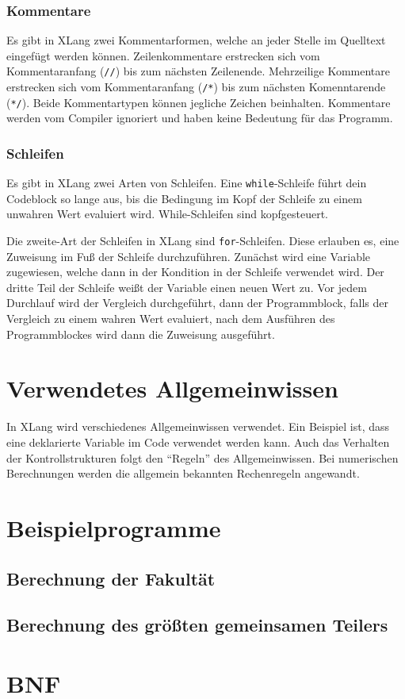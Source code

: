 \documentclass[a4paper]{article}
\begin{document}
\subsubsection{Kommentare}

Es gibt in XLang zwei Kommentarformen, welche an jeder Stelle im Quelltext eingefügt werden können.
Zeilenkommentare erstrecken sich vom Kommentaranfang (\texttt{//}) bis zum nächsten Zeilenende.
Mehrzeilige Kommentare erstrecken sich vom Kommentaranfang (\texttt{/*}) bis zum nächsten
Komenntarende (\texttt{*/}).
Beide Kommentartypen können jegliche Zeichen beinhalten.
Kommentare werden vom Compiler ignoriert und haben keine Bedeutung für das Programm.

\subsubsection{Schleifen}

Es gibt in XLang zwei Arten von Schleifen. Eine \texttt{while}-Schleife führt dein Codeblock so
lange aus, bis die Bedingung im Kopf der Schleife zu einem unwahren Wert evaluiert wird.
While-Schleifen sind kopfgesteuert.

Die zweite-Art der Schleifen in XLang sind \texttt{for}-Schleifen. Diese erlauben es, eine Zuweisung
im Fuß der Schleife durchzuführen. Zunächst wird eine Variable zugewiesen, welche dann in der
Kondition in der Schleife verwendet wird. Der dritte Teil der Schleife weißt der Variable einen
neuen Wert zu. Vor jedem Durchlauf wird der Vergleich durchgeführt, dann der Programmblock, falls
der Vergleich zu einem wahren Wert evaluiert, nach dem Ausführen des Programmblockes wird dann die
Zuweisung ausgeführt.


\section{Verwendetes Allgemeinwissen}

In XLang wird verschiedenes Allgemeinwissen verwendet.
Ein Beispiel ist, dass eine deklarierte Variable im Code verwendet werden kann.
Auch das Verhalten der Kontrollstrukturen folgt den \enquote{Regeln} des Allgemeinwissen.
Bei numerischen Berechnungen werden die allgemein bekannten Rechenregeln angewandt.


\section{Beispielprogramme}

\subsection{Berechnung der Fakultät}



\subsection{Berechnung des größten gemeinsamen Teilers}



\section{BNF}


\end{document}
